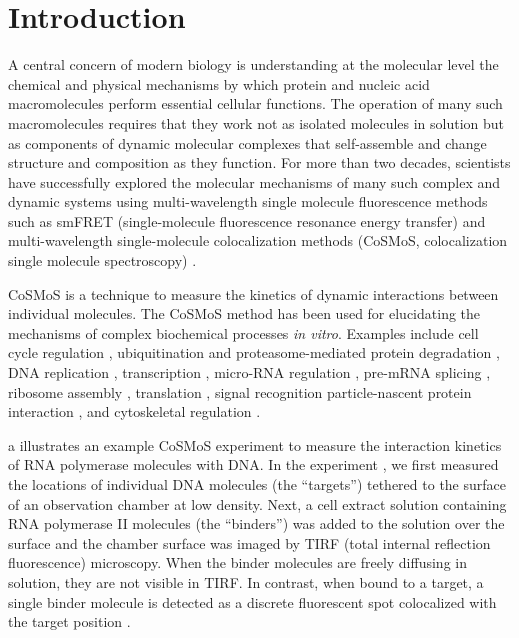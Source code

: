 \section{Introduction}

A central concern of modern biology is understanding at the molecular level the chemical and physical mechanisms by which protein and nucleic acid macromolecules  perform essential cellular functions.  The operation of many such macromolecules requires that they work not as isolated molecules in solution but as components of dynamic molecular complexes that self-assemble and change structure and composition as they function.  For more than  two decades, scientists have successfully explored the molecular mechanisms of many such complex and dynamic systems using multi-wavelength single molecule fluorescence methods such as smFRET (single-molecule fluorescence resonance energy transfer) \citep{Roy2008-fo} and multi-wavelength single-molecule colocalization methods (CoSMoS, colocalization single molecule spectroscopy) \citep{Larson2014-os, Van_Oijen2011-ig}.

CoSMoS is a technique to measure the kinetics of dynamic interactions between individual molecules.  The CoSMoS method has been used for elucidating the mechanisms of complex biochemical processes \textit{in vitro}. Examples include cell cycle regulation \citep{Lu2015-eu}, ubiquitination and proteasome-mediated protein degradation \citep{Lu2015-jq}, DNA replication \citep{Geertsema2014-bt,Ticau2015-ib}, transcription \citep{Zhang2012-no,Friedman2012-if,Friedman2013-sf}, micro-RNA regulation \citep{Salomon2015-kq}, pre-mRNA splicing \citep{Shcherbakova2013-bi, Krishnan2013-fy, Warnasooriya2014-ls}, ribosome assembly \citep{Kim2014-zc}, translation \citep{Wang2015-tt,Tsai2014-mi,OLeary2013-wo}, signal recognition particle-nascent protein interaction \citep{Noriega2014-vj}, and cytoskeletal regulation \citep{Smith2013-qj,Breitsprecher2012-mj}. 

a illustrates an example CoSMoS experiment to measure the interaction kinetics of RNA polymerase molecules with DNA. In the experiment \citep{Rosen2020-zn}, we first measured the locations of individual DNA molecules (the ``targets'') tethered to the surface of an observation chamber at low density. Next, a cell extract solution containing RNA polymerase II molecules (the ``binders'') was added to the solution over the surface and the chamber surface was imaged by TIRF (total internal reflection fluorescence) microscopy. When the binder molecules are freely diffusing in solution, they are not visible in TIRF. In contrast, when bound to a target, a single binder molecule is detected as a discrete fluorescent spot colocalized with the target position \citep{Friedman2006-kb, Friedman2015-nx}.

